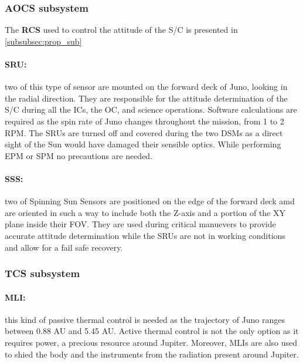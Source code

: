 \subsubsection{AOCS subsystem}
\label{subsubsec:aocs_sub}

\vspace{-1mm}

The \textbf{RCS} used to control the attitude of the S/C is presented in \autoref{subsubsec:prop_sub}

\vspace{-4mm}

\paragraph{SRU:}two of this type of sensor are mounted on the forward deck of Juno, looking in the radial direction. They are responsible for the attitude determination of the S/C during all the ICs, the OC, and science operations. Software calculations are required as the spin rate of Juno changes throughout the mission, from 1 to 2 RPM. The SRUs are turned off and covered during the two DSMs as a direct sight of the Sun would have damaged their sensible optics. While performing EPM or SPM no precautions are needed.\cite{SRU}

\vspace{-4mm}

\paragraph{SSS:}two of Spinning Sun Sensors are positioned on the edge of the forward deck amd are oriented in such a way to include both the Z-axis and a portion of the XY plane inside their FOV. They are used during critical manuevers to provide accurate attitude determination while the SRUs are not in working conditions and allow for a fail safe recovery.\cite{SSS}

\subsubsection{TCS subsystem}
\label{subsubsec:tcs_sub}

\vspace{-1mm}

\paragraph{MLI:}this kind of passive thermal control is needed as the trajectory of Juno ranges between 0.88 AU and 5.45 AU. Active thermal control is not the only option as it requires power, a precious resource around Jupiter. Moreover, MLIs are also used to shied the body and the instruments from the radiation present around Jupiter. 

